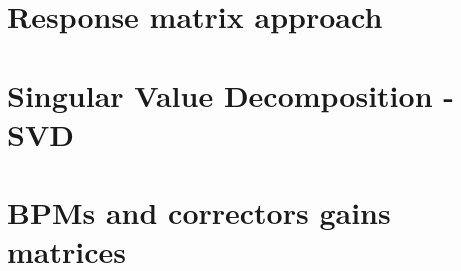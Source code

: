 \appendix

\chapter{Response matrix approach}

\chapter{Singular Value Decomposition - SVD}\label{appendix:svd}

\chapter{BPMs and correctors gains matrices}